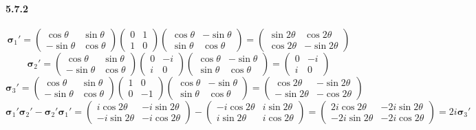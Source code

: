 \documentclass[a4paper]{article}
\begin{document}
\paragraph{5.7.2}
\[
\boldsymbol{\sigma}_1'=
\begin{pmatrix}
\cos\theta&\sin\theta\\
-\sin\theta&\cos\theta
\end{pmatrix}
\begin{pmatrix}
0&1\\
1&0
\end{pmatrix}
\begin{pmatrix}
\cos\theta&-\sin\theta\\
\sin\theta&\cos\theta
\end{pmatrix}=
\begin{pmatrix}
\sin2\theta&\cos2\theta\\
\cos2\theta&-\sin2\theta
\end{pmatrix}
\]
\[
\boldsymbol{\sigma}_2'=
\begin{pmatrix}
\cos\theta&\sin\theta\\
-\sin\theta&\cos\theta
\end{pmatrix}
\begin{pmatrix}
0&-i\\
i&0
\end{pmatrix}
\begin{pmatrix}
\cos\theta&-\sin\theta\\
\sin\theta&\cos\theta
\end{pmatrix}=
\begin{pmatrix}
0&-i\\
i&0
\end{pmatrix}
\]
\[
\boldsymbol{\sigma}_3'=
\begin{pmatrix}
\cos\theta&\sin\theta\\
-\sin\theta&\cos\theta
\end{pmatrix}
\begin{pmatrix}
1&0\\
0&-1
\end{pmatrix}
\begin{pmatrix}
\cos\theta&-\sin\theta\\
\sin\theta&\cos\theta
\end{pmatrix}=
\begin{pmatrix}
\cos2\theta&-\sin2\theta\\
-\sin2\theta&-\cos2\theta
\end{pmatrix}
\]
\[
\boldsymbol{\sigma}_1'\boldsymbol{\sigma}_2'-\boldsymbol{\sigma}_2'\boldsymbol{\sigma}_1'=
\begin{pmatrix}
i\cos2\theta&-i\sin2\theta\\
-i\sin2\theta&-i\cos2\theta
\end{pmatrix}-
\begin{pmatrix}
-i\cos2\theta&i\sin2\theta\\
i\sin2\theta&i\cos2\theta
\end{pmatrix}
=\begin{pmatrix}
2i\cos2\theta&-2i\sin2\theta\\
-2i\sin2\theta&-2i\cos2\theta
\end{pmatrix}=2i\boldsymbol{\sigma}_3'
\]
\end{document}
